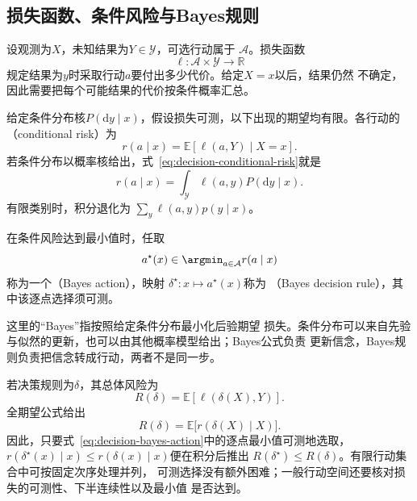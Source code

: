 \subsection{损失函数、条件风险与Bayes规则}
设观测为\(X\)，未知结果为\(Y\in\mathcal{Y}\)，可选行动属于
\(\mathcal{A}\)。损失函数
\[
  \ell:\mathcal{A}\times\mathcal{Y}\to\mathbb{R}
\]
规定结果为\(y\)时采取行动\(a\)要付出多少代价。给定\(X=x\)以后，结果仍然
不确定，因此需要把每个可能结果的代价按条件概率汇总。
\begin{definition}[条件风险与Bayes决策]
\label{def:decision-conditional-risk-bayes-rule}
给定条件分布核$P(\mathrm dy\mid x)$，假设损失可测，以下出现的期望均有限。各行动的
（conditional risk）为
\begin{equation}
  r(a\mid x)
  =
  \mathbb{E}[\ell(a,Y)\mid X=x].
  \label{eq:decision-conditional-risk}
\end{equation}
若条件分布以概率核给出，式~\eqref{eq:decision-conditional-risk}就是
\[
  r(a\mid x)
  =
  \int_{\mathcal{Y}}\ell(a,y)P(\mathrm{d}y\mid x).
\]
有限类别时，积分退化为
\(\sum_y\ell(a,y)p(y\mid x)\)。

在条件风险达到最小值时，任取
\begin{equation}
  a^\star(x)
  \in
  \argmin_{a\in\mathcal{A}}r(a\mid x)
  \label{eq:decision-bayes-action}
\end{equation}
称为一个（Bayes action），映射
\(\delta^\star:x\mapsto a^\star(x)\)称为
（Bayes decision rule），其中该逐点选择须可测。
\end{definition}
这里的“Bayes”指按照给定条件分布最小化后验期望
损失。条件分布可以来自先验与似然的更新，也可以由其他概率模型给出；Bayes公式负责
更新信念，Bayes规则负责把信念转成行动，两者不是同一步。

若决策规则为\(\delta\)，其总体风险为
\begin{equation}
  R(\delta)
  =
  \mathbb{E}[\ell(\delta(X),Y)].
  \label{eq:decision-rule-risk}
\end{equation}
全期望公式给出
\[
  R(\delta)
  =
  \mathbb{E}\bigl[r(\delta(X)\mid X)\bigr].
\]
因此，只要式~\eqref{eq:decision-bayes-action}中的逐点最小值可测地选取，
\(r(\delta^\star(x)\mid x)\leq r(\delta(x)\mid x)\)便在积分后推出
\(R(\delta^\star)\leq R(\delta)\)。有限行动集合中可按固定次序处理并列，
可测选择没有额外困难；一般行动空间还要核对损失的可测性、下半连续性以及最小值
是否达到。

